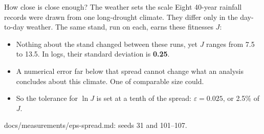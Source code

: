 \documentclass[aspectratio=169,10pt]{beamer}
\newcommand{\src}[1]{\par\vfill{\tiny\color{quiet} #1}}
\begin{document}
\begin{frame}{How close is close enough? The weather sets the scale}
  \small
  Eight 40-year rainfall records were drawn from one long-drought climate. They differ only in
  the day-to-day weather. The same stand, run on each, earns these fitnesses $J$:
  \medskip

  \begin{center}
  \end{center}
  \medskip

  \begin{itemize}
    \item Nothing about the stand changed between these runs, yet $J$ ranges from 7.5 to 13.5.
      In logs, their standard deviation is \textbf{0.25}.
    \item A numerical error far below that spread cannot change what an analysis concludes about
      this climate. One of comparable size could.
    \item So the tolerance for $\ln J$ is set at a tenth of the spread: $\varepsilon = 0.025$,
      or 2.5\% of $J$.
  \end{itemize}
  \src{docs/measurements/eps-spread.md: seeds 31 and 101--107.}
\end{frame}
\end{document}
